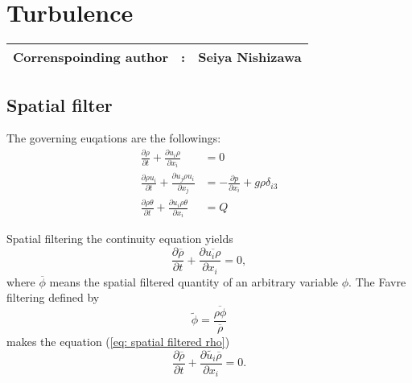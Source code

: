 %

\section{Turbulence}
{\bf \Large
\begin{tabular}{ccc}
\hline
  Correnspoinding author & : & Seiya Nishizawa\\
\hline
\end{tabular}
}

\def\half{\frac{1}{2}}

\subsection{Spatial filter}

The governing euqations are the followings:
\begin{align}
  \frac{\partial\rho}{\partial t} + \frac{\partial u_i \rho}{\partial x_i}
  &= 0 \\
  \frac{\partial\rho u_i}{\partial t}
  + \frac{\partial u_j \rho u_i}{\partial x_j}
  &= -\frac{\partial p}{\partial x_i} + g \rho \delta_{i3} \\
  \frac{\partial\rho \theta}{\partial t}
  + \frac{\partial u_i \rho \theta}{\partial x_i}
  &= Q
\end{align}

Spatial filtering the continuity equation yields
\begin{equation}
  \frac{\partial \overline{\rho}}{\partial t} + \frac{\partial \overline{u_i \rho}}{\partial x_i} = 0, \label{eq: spatial filtered rho}
\end{equation}
where $\overline{\phi}$ means the spatial filtered quantity of an arbitrary variable $\phi$.
The Favre filtering \citep{Favre_1983} defined by
\begin{equation}
  \widetilde{\phi} = \frac{\overline{\rho \phi}}{\overline{\rho}}
\end{equation}
makes the equation (\ref{eq: spatial filtered rho})
\begin{equation}
  \frac{\partial \overline{\rho}}{\partial t} + \frac{\partial \widetilde{u_i}\overline{\rho}}{\partial x_i} = 0.
\end{equation}


